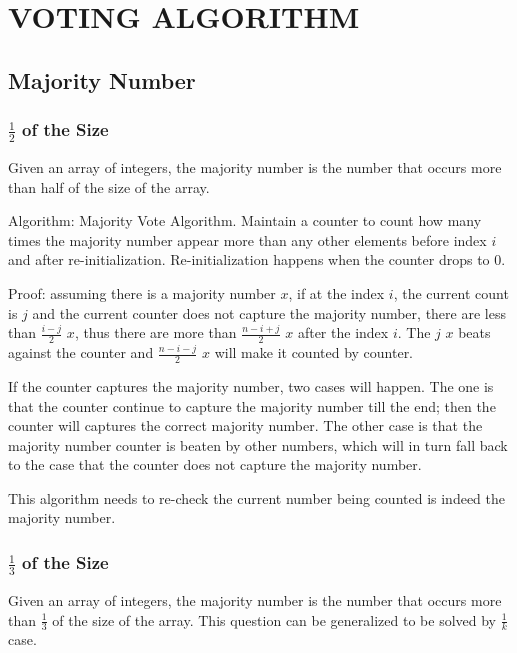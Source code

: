\section{VOTING ALGORITHM}
\subsection{Majority Number}
\subsubsection{$\frac{1}{2}$ of the Size}
Given an array of integers, the majority number is the number that occurs more than half of the size of the array. 

Algorithm: Majority Vote Algorithm. Maintain a counter to count how many times the majority number appear more than any other elements before index $i$ and after re-initialization. Re-initialization happens when the counter drops to 0. 

Proof: assuming there is a majority number $x$, if at the index $i$, the current count is $j$ and the current counter does not capture the majority number, there are less than $\frac{i-j}{2}$ $x$, thus there are more than $\frac{n-i+j}{2}$ $x$ after the index $i$. The $j$ $x$ beats against the counter and $\frac{n-i-j}{2}$ $x$ will make it counted by counter. 

If the counter captures the majority number, two cases will happen. The one is that the counter continue to capture the majority number till the end; then the counter will captures the correct majority number. The other case is that the majority number counter is beaten by other numbers, which will in turn fall back to the case that the counter does not capture the majority number.
 
This algorithm needs to re-check the current number being counted is indeed the majority number.    

\subsubsection{$\frac{1}{3}$ of the Size}
Given an array of integers, the majority number is the number that occurs more than $\frac{1}{3}$ of the size of the array. This question can be generalized to be solved by $\frac{1}{k}$ case. 

